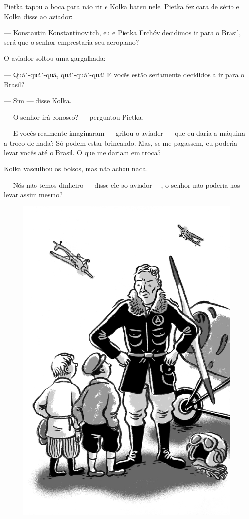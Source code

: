 Pietka tapou a boca para não rir e Kolka bateu nele. Pietka fez cara de
sério e Kolka disse ao aviador:

--- Konstantin Konstantínovitch, eu e Pietka Erchóv decidi­mos ir para o
Brasil, será que o senhor emprestaria seu aeroplano?

O aviador soltou uma gargalhada:

--- Quá"-quá"-quá, quá"-quá"-quá! E vocês estão seriamente deci­didos a ir
para o Brasil?

--- Sim --- disse Kolka.

--- O senhor irá conosco? --- perguntou Pietka.

--- E vocês realmente imaginaram --- gritou o aviador --- que eu daria a
máquina a troco de nada? Só podem estar brincando. Mas, se me pagassem,
eu poderia levar vocês até o Brasil. O que me dariam em troca?

Kolka vasculhou os bolsos, mas não achou nada.

--- Nós não temos dinheiro --- disse ele ao aviador ---, o senhor não
poderia nos levar assim mesmo?

\begin{figure}%
\vspace*{-1.6cm}
\hspace*{-2.2cm}\includegraphics[width=140mm]{./imgs/cena15.jpg}
\end{figure}

